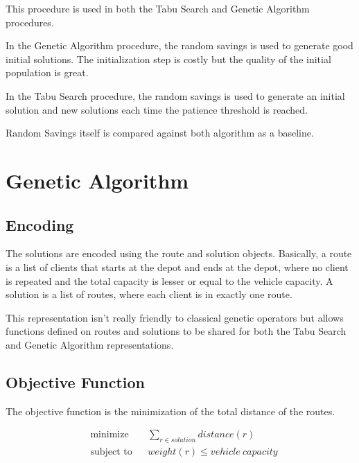 \documentclass{article} %
\begin{document}
This procedure is used in both the Tabu Search and Genetic Algorithm procedures.\newline

In the Genetic Algorithm procedure, the random savings is used to generate good initial solutions. The initialization step is costly but the quality of the initial population is great.\newline

In the Tabu Search procedure, the random savings is used to generate an initial solution and new solutions each time the patience threshold is reached.\newline

Random Savings itself is compared against both algorithm as a baseline.


\newpage
\section{Genetic Algorithm}
\label{genetic_algorithm}

\subsection{Encoding}

The solutions are encoded using the route and solution objects. Basically, a route is a list of clients that starts at the depot and ends at the depot, where no client is repeated and the total capacity is lesser or equal to the vehicle capacity. A solution is a list of routes, where each client is in exactly one route.\newline

This representation isn't really friendly to classical genetic operators but allows functions defined on routes and solutions to be shared for both the Tabu Search and Genetic Algorithm representations.

\subsection{Objective Function}

The objective function is the minimization of the total distance of the routes.

\begin{equation*}
\begin{aligned}
& \text{minimize}
& & \sum\limits_{r \in solution} distance(r) \\
& \text{subject to}
& & weight(r) \leq vehicle\ capacity
\end{aligned}
\end{equation*}
\end{document}

